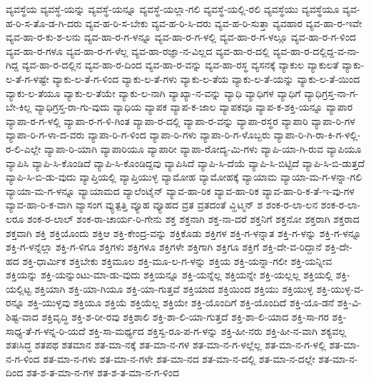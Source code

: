 {ವ್ಯವಸ್ಥೆಯ
ವ್ಯವಸ್ಥೆ-ಯನ್ನು
ವ್ಯವಸ್ಥೆ-ಯನ್ನೂ
ವ್ಯವಸ್ಥೆ-ಯಲ್ಲಾ-ಗಲಿ
ವ್ಯವಸ್ಥೆ-ಯಲ್ಲಿ-ರಲಿ
ವ್ಯವಸ್ಥೆಯು
ವ್ಯವಸ್ಥೆಯೂ
ವ್ಯವ-ಹ-ರಿ-ಸ-ತೊ-ಡ-ಗಿ-ದರು
ವ್ಯವ-ಹ-ರಿ-ಸ-ಬೇಕು
ವ್ಯವ-ಹ-ರಿ-ಸಿ-ದರು
ವ್ಯವ-ಹ-ರಿ-ಸುತ್ತಾ
ವ್ಯವಹಾರ
ವ್ಯವ-ಹಾ-ರ-ಇವೇ
ವ್ಯವ-ಹಾ-ರ-ಕು-ಶ-ಲನು
ವ್ಯವ-ಹಾ-ರ-ಗ-ಳನ್ನೂ
ವ್ಯವ-ಹಾ-ರ-ಗ-ಳಲ್ಲಿ
ವ್ಯವ-ಹಾ-ರ-ಗ-ಳಲ್ಲೂ
ವ್ಯವ-ಹಾ-ರ-ಗ-ಳಿಂದ
ವ್ಯವ-ಹಾ-ರ-ಗಳೂ
ವ್ಯವ-ಹಾ-ರ-ಗ-ಳೆಲ್ಲ
ವ್ಯವ-ಹಾ-ರಜ್ಞಾ-ನ-ವಿಲ್ಲದ
ವ್ಯವ-ಹಾ-ರ-ದಲ್ಲಿ
ವ್ಯವ-ಹಾ-ರ-ದಲ್ಲಿದ್ದ-ವ-ನಾ-ಗಿದ್ದ
ವ್ಯವ-ಹಾ-ರ-ದಲ್ಲಿನ
ವ್ಯವ-ಹಾ-ರ-ದಿಂದ
ವ್ಯವ-ಹಾ-ರ-ವನ್ನು
ವ್ಯವ-ಹಾ-ರಸ್ಥ
ವ್ಯಸನಕ್ಕೆ
ವ್ಯಾಕುಲ
ವ್ಯಾಕುಲತೆ
ವ್ಯಾಕು-ಲ-ತೆ-ಗ-ಳಷ್ಟೇ
ವ್ಯಾಕು-ಲ-ತೆ-ಗ-ಳಿಂದ
ವ್ಯಾಕು-ಲ-ತೆ-ಗಳು
ವ್ಯಾಕು-ಲ-ತೆಯ
ವ್ಯಾಕು-ಲ-ತೆ-ಯನ್ನು
ವ್ಯಾಕು-ಲ-ತೆ-ಯಿಂದ
ವ್ಯಾಕು-ಲ-ತೆಯೂ
ವ್ಯಾಕು-ಲ-ತೆಯೇ
ವ್ಯಾಕು-ಲ-ನಾಗಿ
ವ್ಯಾಖ್ಯಾ-ನ-ವನ್ನು
ವ್ಯಾಧಿ
ವ್ಯಾಧಿಗಳ
ವ್ಯಾಧಿಗೆ
ವ್ಯಾಧಿಗ್ರಸ್ತ-ನಾ-ಗ-ಬೇ-ಕಿಲ್ಲ
ವ್ಯಾಧಿಗ್ರಸ್ತ-ರಾ-ಗು-ವುದು
ವ್ಯಾಧಿಯ
ವ್ಯಾಪಕ
ವ್ಯಾಪ-ಕ-ಜಾಲ
ವ್ಯಾಪಕವೂ
ವ್ಯಾಪ-ಕ-ಶಕ್ತಿ-ಯನ್ನೂ
ವ್ಯಾಪಾರ
ವ್ಯಾಪಾ-ರ-ಗ-ಳಲ್ಲಿ
ವ್ಯಾಪಾ-ರ-ಗ-ಳಿ-ಗಿಂತ
ವ್ಯಾಪಾ-ರ-ದಲ್ಲಿ
ವ್ಯಾಪಾ-ರ-ವನ್ನು
ವ್ಯಾಪಾ-ರಸ್ಥರ
ವ್ಯಾಪಾರಿ
ವ್ಯಾಪಾ-ರಿ-ಗಳ
ವ್ಯಾಪಾ-ರಿ-ಗ-ಳಾ-ದ-ವರು
ವ್ಯಾಪಾ-ರಿ-ಗ-ಳಿಂದ
ವ್ಯಾಪಾ-ರಿ-ಗಳು
ವ್ಯಾಪಾ-ರಿ-ಗ-ಳೊಬ್ಬರು
ವ್ಯಾಪಾ-ರಿ-ಗಿ-ರಾ-ಕಿ-ಗ-ಳಲ್ಲಿ-ರ-ಲಿ-ಎಲ್ಲೇ
ವ್ಯಾಪಾ-ರಿ-ಯಾಗಿ
ವ್ಯಾಪಾರಿಯೂ
ವ್ಯಾಪಾರೀ
ವ್ಯಾಪಾ-ರೋದ್ಯ-ಮಿ-ಗಳು
ವ್ಯಾಪಿ-ಯಾ-ಗಿ-ರುವ
ವ್ಯಾಪಿಯೂ
ವ್ಯಾಪಿಸಿ
ವ್ಯಾಪಿ-ಸಿ-ಕೊಂಡಿದೆ
ವ್ಯಾಪಿ-ಸಿ-ಕೊಂಡಿದ್ದವು
ವ್ಯಾಪಿಸಿದೆ
ವ್ಯಾಪಿ-ಸಿ-ದೆಯೆ
ವ್ಯಾಪಿ-ಸಿ-ಬಿಟ್ಟಿದೆ
ವ್ಯಾಪಿ-ಸಿ-ಬಿ-ಡುತ್ತದೆ
ವ್ಯಾಪಿ-ಸಿ-ಬಿ-ಡು-ವುದು
ವ್ಯಾಪ್ತಿಯಲ್ಲಿ
ವ್ಯಾಪ್ತಿಯುಳ್ಳ
ವ್ಯಾಮೋಹ
ವ್ಯಾಮೋಹಕ್ಕೆ
ವ್ಯಾಯಾಮ
ವ್ಯಾಯಾ-ಮ-ಗ-ಳನ್ನಾ-ಗಲಿ
ವ್ಯಾಯಾ-ಮ-ಗ-ಳನ್ನೂ
ವ್ಯಾಯಾಮದ
ವ್ಯಾಲೆಂಟೈನ್
ವ್ಯಾವ-ಹಾ-ರಿಕ
ವ್ಯಾವ-ಹಾ-ರಿಕ
ವ್ಯಾವ-ಹಾ-ರಿ-ಕ-ತೆ-ಇ-ವು-ಗಳ
ವ್ಯಾವ-ಹಾ-ರಿ-ಕ-ವಾಗಿ
ವ್ಯಾಸಂಗ
ವ್ಯುತ್ಪತ್ತಿ
ವ್ಯೂಹ
ವ್ಯೂಹದ
ವ್ರತ
ವ್ರತದಂತೆ
ವ್ಹಿಟ್ಮನ್
ಶ
ಶಂಕ-ರ-ಲಾ-ಲನ
ಶಂಕ-ರ-ಲಾ-ಲರೂ
ಶಂಕ-ರ-ಲಾಲ್
ಶಂಕ-ರಾ-ಚಾರ್ಯ-ರಿ-ಗೇನು
ಶಕ್ತ
ಶಕ್ತನಾಗಿ
ಶಕ್ತ-ನಾ-ದರೆ
ಶಕ್ತನಿಗೆ
ಶಕ್ತನೋ
ಶಕ್ತರಾಗಿ
ಶಕ್ತರಾದ
ಶಕ್ತವಾಗಿ
ಶಕ್ತಿ
ಶಕ್ತಿಯೊಂದು
ಶಕ್ತಿಆ
ಶಕ್ತಿ-ಕೇಂದ್ರ-ವನ್ನು
ಶಕ್ತಿಕೊಡು
ಶಕ್ತಿಗಳ
ಶಕ್ತಿ-ಗ-ಳನ್ನಾತ
ಶಕ್ತಿ-ಗ-ಳನ್ನು
ಶಕ್ತಿ-ಗ-ಳನ್ನೂ
ಶಕ್ತಿ-ಗ-ಳನ್ನೆಲ್ಲಾ
ಶಕ್ತಿ-ಗ-ಳಿಗೂ
ಶಕ್ತಿಗಳು
ಶಕ್ತಿಗಳೂ
ಶಕ್ತಿಗಳೇ
ಶಕ್ತಿಗಾಗಿ
ಶಕ್ತಿಗೂ
ಶಕ್ತಿಗೆ
ಶಕ್ತಿ-ದೇ-ವ-ರಿದ್ದಾನೆ
ಶಕ್ತಿ-ದೇ-ಹದ
ಶಕ್ತಿ-ಧಾರ್ಮಿಕ
ಶಕ್ತಿಬೇಕು
ಶಕ್ತಿಮೂಲ
ಶಕ್ತಿ-ಮೂ-ಲ-ಗ-ಳನ್ನು
ಶಕ್ತಿಯ
ಶಕ್ತಿ-ಯನ್ನಾ-ಗಲೀ
ಶಕ್ತಿ-ಯನ್ನೀವ
ಶಕ್ತಿಯನ್ನು
ಶಕ್ತಿ-ಯನ್ನುಂಟು-ಮಾ-ಡು-ವುದು
ಶಕ್ತಿಯನ್ನೂ
ಶಕ್ತಿ-ಯನ್ನೆಲ್ಲ
ಶಕ್ತಿಯನ್ನೇ
ಶಕ್ತಿ-ಯಲ್ಲಲ್ಲ
ಶಕ್ತಿಯಲ್ಲಿ
ಶಕ್ತಿ-ಯಲ್ಲಿಟ್ಟ
ಶಕ್ತಿಯಾಗಿ
ಶಕ್ತಿ-ಯಾ-ಗಿಯೂ
ಶಕ್ತಿ-ಯಾ-ಗುತ್ತವೆ
ಶಕ್ತಿಯಾದ
ಶಕ್ತಿಯಿಂದ
ಶಕ್ತಿಯು
ಶಕ್ತಿಯುಳ್ಳ
ಶಕ್ತಿ-ಯುಳ್ಳ-ವ-ರನ್ನೂ
ಶಕ್ತಿ-ಯುಳ್ಳವು
ಶಕ್ತಿಯೂ
ಶಕ್ತಿಯೆ
ಶಕ್ತಿಯೆಲ್ಲ
ಶಕ್ತಿಯೇ
ಶಕ್ತಿ-ಯೊಂದಿಗೆ
ಶಕ್ತಿ-ಯೊಂದಿದೆ
ಶಕ್ತಿ-ಯೊ-ಡನೆ
ಶಕ್ತಿ-ವಿ-ಶಿಷ್ಟ-ವಾದ
ಶಕ್ತಿವೃದ್ಧಿ
ಶಕ್ತಿ-ಶ-ರೀ-ರವು
ಶಕ್ತಿಶಾಲಿ
ಶಕ್ತಿ-ಶಾ-ಲಿ-ಯಾ-ಗುತ್ತದೆ
ಶಕ್ತಿ-ಶಾ-ಲಿ-ಯಾದ
ಶಕ್ತಿ-ಸಾ-ಗರ
ಶಕ್ತಿ-ಸಾಧ್ಯ-ತೆ-ಗ-ಳನ್ನ-ರಿ-ಯದೆ
ಶಕ್ತಿ-ಸಾ-ಮರ್ಥ್ಯದ
ಶಕ್ತಿಸ್ವ-ರೂ-ಪ-ಗ-ಳನ್ನು
ಶಕ್ತಿ-ಹೀ-ನರು
ಶಕ್ತಿ-ಹೀ-ನ-ವಾಗಿ
ಶಕ್ಯವಲ್ಲ
ಶತಃಸಿದ್ಧ
ಶತಪಥ
ಶತಮಾನ
ಶತ-ಮಾ-ನಕ್ಕೆ
ಶತ-ಮಾ-ನ-ಗಳ
ಶತ-ಮಾ-ನ-ಗ-ಳಲ್ಲೆಲ್ಲ
ಶತ-ಮಾ-ನ-ಗ-ಳಲ್ಲಿ
ಶತ-ಮಾ-ನ-ಗ-ಳಿಂದ
ಶತ-ಮಾ-ನ-ಗಳು
ಶತ-ಮಾ-ನ-ಗಳೇ
ಶತ-ಮಾ-ನದ
ಶತ-ಮಾ-ನ-ದಲ್ಲಿ
ಶತ-ಮಾ-ನ-ದಲ್ಲೇ
ಶತ-ಮಾ-ನ-ದಿಂದ
ಶತ-ಶ-ತ-ಮಾ-ನ-ಗಳ
ಶತ-ಶ-ತ-ಮಾ-ನ-ಗ-ಳಿಂದ
}
